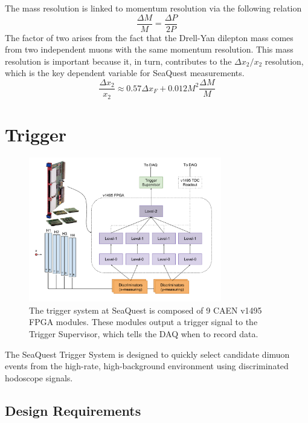 The mass resolution is linked to momentum resolution via the following relation
\begin{equation}
\frac{\Delta M}{M} = \frac{\Delta P}{2 P}
\end{equation}
The factor of two arises from the fact that the Drell-Yan dilepton mass comes from two independent muons with the same momentum resolution. This mass resolution is important because it, in turn, contributes to the $\Delta x_2 / x_2$ resolution, which is the key dependent variable for SeaQuest measurements.
\begin{equation}
\frac{\Delta x_2}{x_2} \approx 0.57 \Delta x_F + 0.012 M^2 \frac{\Delta M}{M}
\end{equation}



\section{Trigger}

\begin{figure}
	\centering
	\includegraphics[width=0.75\textwidth]{figures/v1495-trigger.pdf}
	\caption{The trigger system at SeaQuest is composed of 9 CAEN v1495 FPGA modules. These modules output a trigger signal to the Trigger Supervisor, which tells the DAQ when to record data.}
	\label{fig:1495-trigger}
\end{figure}

The SeaQuest Trigger System is designed to quickly select candidate dimuon events from the high-rate, high-background environment using discriminated hodoscope signals.

\subsection{Design Requirements}

